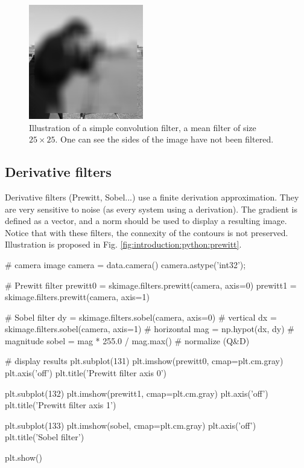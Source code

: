 \begin{figure}[htbp]
 \centering 
 \includegraphics[width=5cm]{myconv2d.png}
 \caption{Illustration of a simple convolution filter, a mean filter of size $25\times 25$. One can see the sides of the image have not been filtered.}
\end{figure}




\vspace*{-7pt}
\subsection{Derivative filters}
Derivative filters (Prewitt, Sobel...) use a finite derivation approximation. They are very sensitive to noise (as every system using a derivation). The gradient is defined as a vector, and a norm should be used to display a resulting image. Notice that with these filters, the connexity of the contours is not preserved.
Illustration is proposed in Fig. \ref{fig:introduction:python:prewitt}.

\begin{python}
# camera image
camera = data.camera()
camera.astype('int32');

# Prewitt filter
prewitt0 = skimage.filters.prewitt(camera, axis=0)
prewitt1 = skimage.filters.prewitt(camera, axis=1)

# Sobel filter
dy = skimage.filters.sobel(camera, axis=0) # vertical
dx = skimage.filters.sobel(camera, axis=1) # horizontal
mag = np.hypot(dx, dy)  # magnitude
sobel = mag * 255.0 / mag.max()  # normalize (Q&D)

# display results
plt.subplot(131)
plt.imshow(prewitt0, cmap=plt.cm.gray)
plt.axis('off')
plt.title('Prewitt filter axis 0')

plt.subplot(132)
plt.imshow(prewitt1, cmap=plt.cm.gray)
plt.axis('off')
plt.title('Prewitt filter axis 1')

plt.subplot(133)
plt.imshow(sobel, cmap=plt.cm.gray)
plt.axis('off')
plt.title('Sobel filter')

plt.show()
\end{python}

